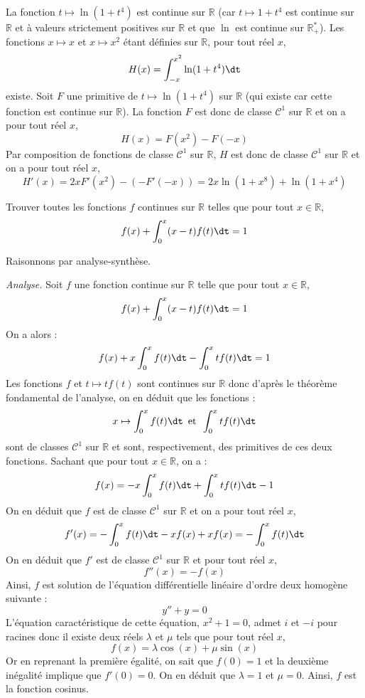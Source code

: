 \documentclass[a4paper,10pt]{report}
\begin{document}
\corr La fonction $t \mapsto \ln(1+t^4)$ est continue sur $\mathbb{R}$ (car $t \mapsto 1+t^4$ est continue sur $\mathbb{R}$ et à valeurs strictement positives sur $\mathbb{R}$ et que $\ln$ est continue sur $\mathbb{R}_+^{*}$). Les fonctions $x \mapsto x$ et $x \mapsto x^2$ étant définies sur $\mathbb{R}$, pour tout réel $x$,
$$ H(x) = \int_{-x}^{x^2} \ln(1+t^4) \dt$$
existe. Soit $F$ une primitive de $t \mapsto \ln(1+t^4)$ sur $\mathbb{R}$ (qui existe car cette fonction est continue sur $\mathbb{R}$). La fonction $F$ est donc de classe $\mathcal{C}^1$ sur $\mathbb{R}$ et on a pour tout réel $x$,
$$ H(x) = F(x^2)-F(-x)$$
Par composition de fonctions de classe $\mathcal{C}^1$ sur $\mathbb{R}$, $H$ est donc de classe $\mathcal{C}^1$ sur $\mathbb{R}$ et on a pour tout réel $x$,
$$ H'(x) = 2x F'(x^2)-(-F'(-x)) = 2x \ln(1+x^8)+ \ln(1+x^4)$$


\begin{Exercice}{} Trouver toutes les fonctions $f$ continues sur $\mathbb{R}$ telles que pour tout $x \in \mathbb{R}$,
$$ f(x) + \int_{0}^x (x-t)f(t) \dt =1$$
\end{Exercice} 

\corr Raisonnons par analyse-synthèse.

\medskip

\noindent \textit{Analyse.} Soit $f$ une fonction continue sur $\mathbb{R}$ telle que pour tout $x \in \mathbb{R}$,
$$ f(x) + \int_{0}^x (x-t)f(t) \dt =1$$
On a alors :
$$ f(x) + x \int_0^x f(t) \dt - \int_0^x t f(t) \dt = 1$$
Les fonctions $f$ et $t \mapsto t f(t)$ sont continues sur $\mathbb{R}$ donc d'après le théorème fondamental de l'analyse, on en déduit que les fonctions :
$$x \mapsto \int_0^x f(t) \dt \, \hbox{ et } \, \int_0^x tf(t) \dt$$ 
sont de classes $\mathcal{C}^1$ sur $\mathbb{R}$ et sont, respectivement, des primitives de ces deux fonctions. Sachant que pour tout $x \in \mathbb{R}$, on a :
$$ f(x) =  -x \int_0^x f(t) \dt + \int_0^x t f(t) \dt - 1$$
On en déduit que $f$ est de classe $\mathcal{C}^1$ sur $\mathbb{R}$ et on a pour tout réel $x$,
$$ f'(x) = - \int_0^x f(t) \dt - xf(x) + xf(x) = - \int_0^x f(t) \dt$$
On en déduit que $f'$ est de classe $\mathcal{C}^1$ sur $\mathbb{R}$ et pour tout réel $x$,
$$ f''(x) = -f(x)$$
Ainsi, $f$ est solution de l'équation différentielle linéaire d'ordre deux homogène suivante :
$$ y''+y=0$$
L'équation caractéristique de cette équation, $x^2+1=0$, admet $i$ et $-i$ pour racines donc il existe deux réels $\lambda$ et $\mu$ tels que pour tout réel $x$,
$$ f(x) = \lambda \cos(x) + \mu \sin(x)$$
Or en reprenant la première égalité, on sait que $f(0)=1$ et la deuxième inégalité implique que $f'(0)=0$. On en déduit que $\lambda=1$ et $\mu=0$. Ainsi, $f$ est la fonction cosinus.
\end{document}

